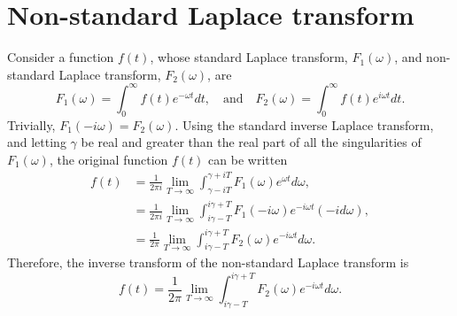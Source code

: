 \documentclass[12pt]{article}
\begin{document}
\section{Non-standard Laplace transform}\label{app: laplace trans}
Consider a function $f(t)$, whose standard Laplace transform, $F_1(\omega)$, and non-standard Laplace transform, $F_2(\omega)$, are
\begin{equation}
F_1(\omega) = \int_0^\infty f(t) e^{-\omega t} dt,
\quad \text{and} \quad
F_2(\omega) = \int_0^\infty f(t) e^{i\omega t} dt.
\end{equation}
Trivially, $F_1(-i\omega) = F_2(\omega)$. Using the standard inverse Laplace transform, and letting $\gamma$ be real and greater than the real part of all the singularities of $F_1(\omega)$, the original function $f(t)$ can be written
\begin{align}
f(t) & = \frac{1}{2\pi i} \lim_{T\to\infty} \int_{\gamma - iT}^{\gamma + iT} F_1(\omega)e^{\omega t} d\omega, \\
& = \frac{1}{2\pi i} \lim_{T\to\infty} \int_{i\gamma - T}^{i\gamma + T} F_1(-i\omega)e^{-i\omega t} (-id\omega), \\
& = \frac{1}{2\pi} \lim_{T\to\infty} \int_{i\gamma - T}^{i\gamma + T} F_2(\omega)e^{-i\omega t} d\omega.
\end{align}
Therefore, the inverse transform of the non-standard Laplace transform is
\begin{equation}
f(t) = \frac{1}{2\pi} \lim_{T\to\infty} \int_{i\gamma - T}^{i\gamma + T} F_2(\omega)e^{-i\omega t} d\omega.
\end{equation}
\end{document}
